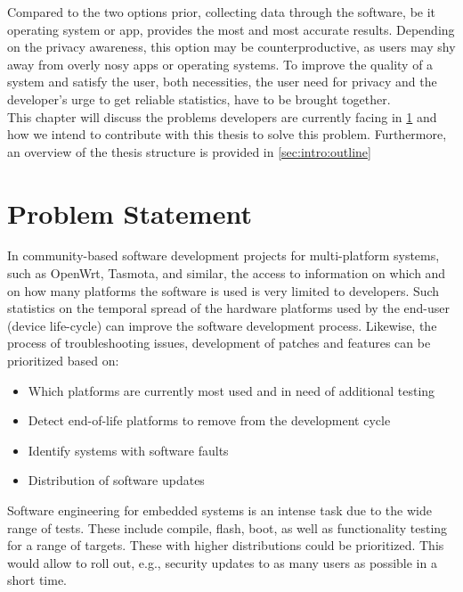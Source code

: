 Compared to the two options prior, collecting data through the software, be it operating system or app, provides the most and most accurate results. Depending on the privacy awareness, this option may be counterproductive, as users may shy away from overly nosy apps or operating systems. To improve the quality of a system and satisfy the user, both necessities, the user need for privacy and the developer's urge to get reliable statistics, have to be brought together.\\

This chapter will discuss the problems developers are currently facing in \ref{sec:intro:probstatement} and how
we intend to contribute with this thesis to solve this problem. Furthermore, an 
overview of the thesis structure is provided in \ref{sec:intro:outline}




\section{Problem Statement}
\label{sec:intro:probstatement}
%
In community-based software development projects for multi-platform systems, such as
OpenWrt, Tasmota, and similar, the access to information on which and on how many platforms
the software is used is very limited to developers.
Such statistics on the temporal spread of the hardware platforms used by
the end-user (device life-cycle) can improve the software development process.
Likewise, the process of troubleshooting issues, development of patches and features can be prioritized based on:
\begin{itemize}
    \item Which platforms are currently most used and in need of additional testing
    \item Detect end-of-life platforms to remove from the development cycle
    \item Identify systems with software faults
    \item Distribution of software updates
\end{itemize}

Software engineering for embedded systems is an intense task due to the wide range of tests.
These include compile, flash, boot, as well as functionality testing for a range of targets. These with higher distributions could be prioritized.
This would allow to roll out, e.g., security updates to as many users as possible in a short time.\\

